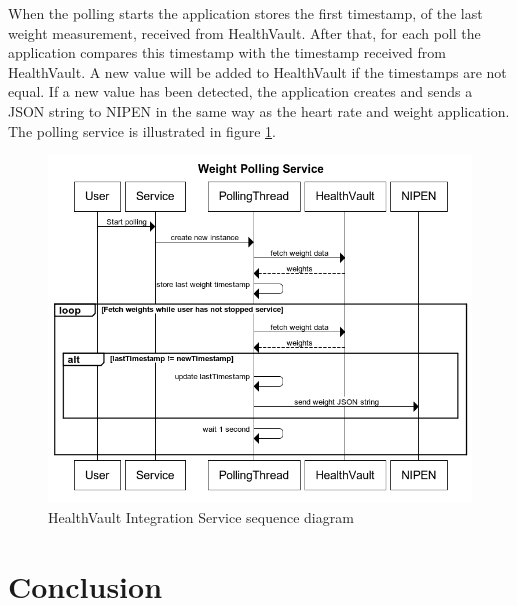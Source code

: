 When the polling starts the application stores the first timestamp, of the last weight measurement, received from HealthVault.
After that, for each poll the application compares this timestamp with the timestamp received from HealthVault.
A new value will be added to HealthVault if the timestamps are not equal.
If a new value has been detected, the application creates and sends a JSON string to NIPEN in the same way as the heart rate and weight application.
The polling service is illustrated in figure \ref{figure:weight-polling-service}.

\begin{figure}[h]
\centering
\includegraphics[scale=0.8]{../Figures/weight-polling-service.png}
\caption{HealthVault Integration Service sequence diagram}
\label{figure:weight-polling-service}
\end{figure}

\section{Conclusion}
